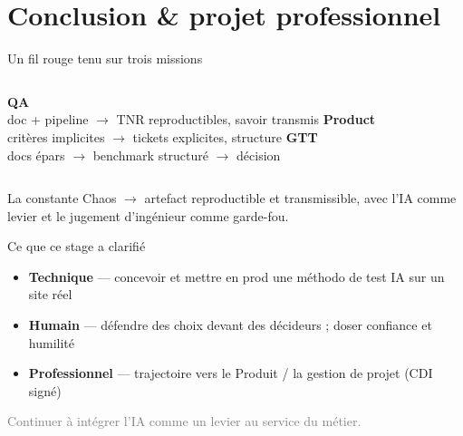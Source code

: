\section{Conclusion \& projet professionnel}

\begin{frame}{Un fil rouge tenu sur trois missions}
  \begin{columns}[T]
    \textbf{QA}\\ \footnotesize doc + pipeline $\to$ TNR reproductibles, savoir transmis
    \textbf{Product}\\ \footnotesize critères implicites $\to$ tickets explicites, structure
    \textbf{GTT}\\ \footnotesize docs épars $\to$ benchmark structuré $\to$ décision
  \end{columns}
  \vskip 10pt
  \begin{block}{La constante}
    \alert{Chaos $\to$ artefact reproductible et transmissible}, avec l'IA comme levier
    et le jugement d'ingénieur comme garde-fou.
  \end{block}
\end{frame}

\begin{frame}{Ce que ce stage a clarifié}
  \begin{itemize}
    \item \textbf{Technique} --- concevoir et mettre en prod une méthodo de test IA sur un site réel
    \item \textbf{Humain} --- défendre des choix devant des décideurs ; doser confiance et humilité
    \item \textbf{Professionnel} --- trajectoire vers le \alert{Produit} / la gestion de projet (CDI signé)
  \end{itemize}
  \vskip 8pt
  \centerline{\footnotesize\textcolor{gray}{Continuer à intégrer l'IA comme un levier au service du métier.}}
\end{frame}
